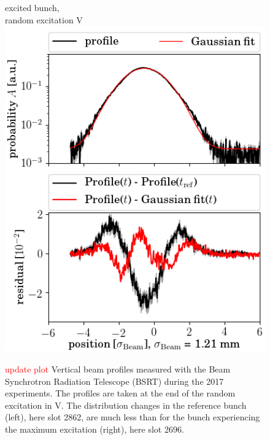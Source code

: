 \documentclass[%
 reprint,
 amsmath,amssymb,
 aps,
prstab,
]{revtex4-1}
\begin{document}
\begin{figure}[h]
\begin{minipage}[t]{0.49\linewidth}
		excited bunch,\\ random excitation V		\includegraphics[width=1.0\linewidth]{profile_v_7thhv_slot_2696.png}
	\end{minipage}
	\caption{\label{fig:ranexpprof}\textcolor{red}{update plot} Vertical beam profiles measured with the Beam Synchrotron Radiation Telescope (BSRT) during the 2017 experiments. The profiles are taken at the end of the random excitation in V. The distribution changes in the reference bunch (left), here slot 2862, are much less than for the bunch experiencing the maximum excitation (right), here slot 2696.}
\end{figure}
\end{document}
